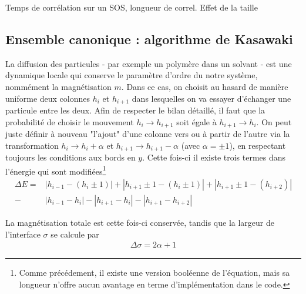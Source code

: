 Temps de corrélation sur un SOS, longueur de correl. 
Effet de la taille 
	\subsection{Ensemble canonique : algorithme de Kasawaki}
	
La diffusion des particules - par exemple un polymère dans un solvant - est une dynamique locale qui conserve le paramètre d'ordre du notre système, nommément la magnétisation $m$. Dans ce cas, on choisit au hasard de manière uniforme deux colonnes $h_i$ et $h_{i+1}$ dans lesquelles on va essayer d'échanger une particule entre les deux. Afin de respecter le bilan détaillé, il faut que la probabilité de choisir le mouvement $h_i \rightarrow h_{i+1}$ soit égale à $h_{i+1} \rightarrow h_i$. On peut juste définir à nouveau "l'ajout" d'une colonne vers ou à partir de l'autre via la transformation $h_i \rightarrow h_i + \alpha$ et $h_{i+1} \rightarrow h_{i+1} - \alpha$ (avec $\alpha=\pm 1$), en respectant toujours les conditions aux bords en $y$. Cette fois-ci il existe trois termes dans l'énergie qui sont modifiées\footnote{Comme précédement, il existe une version booléenne de l'équation, mais sa longueur n'offre aucun avantage en terme d'implémentation dans le code.}
\begin{align}
	\Delta E = &|h_{i-1}-(h_i \pm 1)| + |h_{i+1} \pm 1 -(h_i \pm 1)| + |h_{i+1}\pm 1-(h_{i+2} )| \\
	- &|h_{i-1}-h_i| - |h_{i+1}-h_i| - |h_{i+1}-h_{i+2}|
\end{align}

La magnétisation totale est cette fois-ci conservée, tandis que la largeur de l'interface $\sigma$ se calcule par
\begin{align}
	\Delta \sigma = 2 \alpha  + 1
\end{align}

